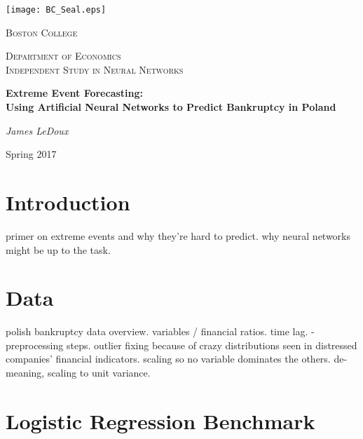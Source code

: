 \documentclass[12pt]{article}  %
\theoremstyle{definition}
\theoremstyle{remark}
\begin{document}
	\begin{titlepage}
		\centering
		\texttt{[image: BC\_Seal.eps]}\par\vspace{1cm}
		{\scshape\huge Boston College \par}
		\vspace{1cm}
		{\scshape\Large Department of Economics\\
		Independent Study in Neural Networks\par}
		\vspace{1.5cm}
		{\huge\bfseries Extreme Event Forecasting:\\ Using Artificial Neural Networks to Predict Bankruptcy in Poland\par}
		\vspace{2cm}
		{\Large\itshape
		James LeDoux}
		\vfill

		{\large Spring 2017\par}
	\end{titlepage}

\section{Introduction}
primer on extreme events and why they're hard to predict. why neural networks might be up to the task. 

\section{Data}
polish bankruptcy data overview. variables / financial ratios. time lag. 
- preprocessing steps. outlier fixing because of crazy distributions seen in distressed companies' financial indicators. scaling so no variable dominates the others. de-meaning, scaling to unit variance. 

\section{Logistic Regression Benchmark}
\end{document}
